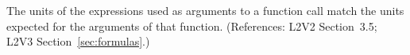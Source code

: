 The units of the expressions used as arguments to a function call
 match the units expected for the arguments of that function.
(References: L2V2 Section~3.5; L2V3 Section~\ref{sec:formulas}.)
